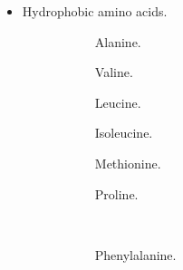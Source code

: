\documentclass[../notes.tex]{subfiles}
\begin{document}
\begin{itemize}
    \item Hydrophobic amino acids.
    \begin{figure}[H]
        \centering
        \footnotesize
        \begin{subfigure}[b]{0.16\linewidth}
            \centering
            \caption{Alanine.}
            \label{fig:AAachiralA}
        \end{subfigure}
        \begin{subfigure}[b]{0.16\linewidth}
            \centering
            \caption{Valine.}
            \label{fig:AAachiralV}
        \end{subfigure}
        \begin{subfigure}[b]{0.16\linewidth}
            \centering
            \caption{Leucine.}
            \label{fig:AAachiralL}
        \end{subfigure}
        \begin{subfigure}[b]{0.16\linewidth}
            \centering
            \caption{Isoleucine.}
            \label{fig:AAachiralI}
        \end{subfigure}
        \begin{subfigure}[b]{0.16\linewidth}
            \centering
            \caption{Methionine.}
            \label{fig:AAachiralM}
        \end{subfigure}
        \begin{subfigure}[b]{0.16\linewidth}
            \centering
            \caption{Proline.}
            \label{fig:AAachiralP}
        \end{subfigure}\\[2em]
        \begin{subfigure}[b]{0.25\linewidth}
            \centering
            \caption{Phenylalanine.}
            \label{fig:AAachiralF}
        \end{subfigure}
        \begin{subfigure}[b]{0.3\linewidth}
            \centering

\end{subfigure}
\end{figure}
\end{itemize}
\end{document}
